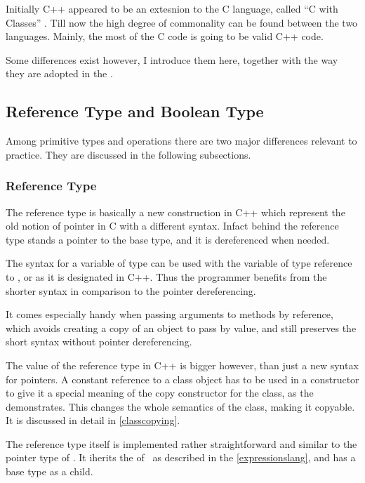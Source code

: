 
Initially C++ appeared to be an extesnion to the C language, called ``C with Classes'' \cite{cwithclasses}. Till now the high degree
of commonality can be found between the two languages. Mainly, the most of the C code is going to be valid C++ code. 

Some differences exist however, I introduce them here, together with the way they are adopted in the \pcpp.

\subsection{Reference Type and Boolean Type}

Among primitive types and operations there are two major differences relevant to practice.
They are discussed in the following subsections.

\subsubsection{Reference Type}

The reference type is basically a new construction in C++ which represent the old notion of pointer in C with a different syntax.
Infact behind the reference type stands a pointer to the base type, and it is dereferenced when needed. 

The syntax for a variable of type  can be used with the variable of type reference to , or  as it is designated in C++.
Thus the programmer benefits from the shorter syntax in comparison to the pointer dereferencing.

It comes especially handy when passing arguments to methods by reference, which avoids creating a copy of an object to pass by 
value, and still preserves the short syntax without pointer dereferencing.


The value of the reference type in C++ is bigger however, than just a new syntax for pointers. A constant reference to a class object 
has to be used in a constructor to give it a special meaning of the copy constructor for the class, as the  demonstrates.
This changes the whole semantics of the class, making it copyable. It is discussed in detail in \ref{classcopying}.

The reference type itself is implemented rather straightforward and similar to the pointer type of \mbdr. It iherits the  
 of \mbdr\, as described in the \ref{expressionslang}, and has a base type as a child.


